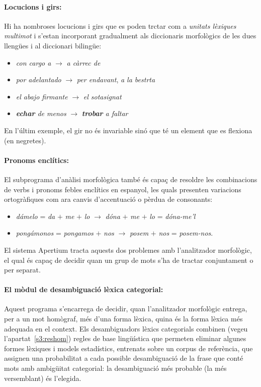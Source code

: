  \paragraph{Locucions i girs:} Hi ha nombroses locucions i girs que es
 poden trctar com a \emph{unitats lèxiques multimot} i s'estan
 incorporant gradualment als diccionaris morfològics de les dues
 llengües i al diccionari bilingüe:
 \begin{itemize}
 \item \emph{con cargo a} $\rightarrow$ \emph{a càrrec de}
 \item \emph{por adelantado} $\rightarrow$ \emph{per endavant}, \emph{a la bestrta}
 \item \emph{el abajo firmante} $\rightarrow$ \emph{el sotasignat}
 \item \emph{{\bf echar} de menos} $\rightarrow$ \emph{{\bf trobar} a faltar}
 \end{itemize}
 En l'últim exemple, el gir no és invariable sinó que té un element que
 es flexiona (en negretes).

 \paragraph{Pronoms enclítics:} El subprograma d'anàlisi morfològica també és capaç de resoldre les
 combinacions de verbs i pronoms febles enclítics en espanyol, les
 quals presenten variacions ortogràfiques com ara canvis d'accentuació
 o pèrdua de consonants:
 \begin{itemize}
 \item \emph{d\'{a}melo} = \emph{da} $+$ \emph{me} $+$ \emph{lo} $\rightarrow$
 \emph{dóna} $+$ \emph{me} $+$ \emph{lo} = \emph{dóna-me'l}
 \item \emph{pong\'{a}monos} = \emph{pongamos} $+$ \emph{nos} $\rightarrow$ {\em
 posem} $+$ \emph{nos} = \emph{posem-nos}.  
 \end{itemize}

 El sistema Apertium tracta aquests dos problemes amb l'analitzador
 morfològic, el qual és capaç de decidir quan un grup de mots s'ha de
 tractar conjuntament o per separat.

 \paragraph{El mòdul de desambiguació lèxica categorial:}
Aquest programa s'encarrega de decidir, quan l'analitzador morfològic
entrega, per a un mot homògraf, més d'una forma lèxica, quina és la
forma lèxica més adequada en el context. Els desambiguadors lèxics
categorials combinen (vegeu l'apartat~\ref{s3:reshom}) regles de base
lingüística que permeten eliminar algunes formes lèxiques i models
estadístics, entrenats sobre un corpus de referència, que assignen una
probabilitat a cada possible desambiguació de la frase que conté mots
amb ambigüitat categorial: la desambiguació més probable (la més
versemblant) és l'elegida.

